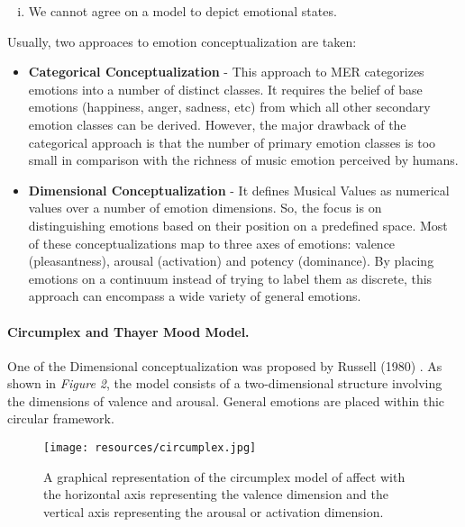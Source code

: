 {\begin{enumerate}[(i)]
        \item We cannot agree on a model to depict emotional states.
        \end{enumerate}

Usually, two approaces to emotion conceptualization are taken: 

\begin{itemize}
    \item \textbf{Categorical Conceptualization} - This approach to MER categorizes emotions into a number of distinct classes. 
        It requires the belief of base emotions (happiness, anger, sadness, etc) from which all other secondary emotion classes can be derived.\cite{Ekman1992}
        However, the major drawback of the categorical approach is that the number of primary emotion classes is too small in comparison with the richness of music emotion perceived by humans.

    \item \textbf{Dimensional Conceptualization} - It defines Musical Values as numerical values over a number of emotion dimensions. 
        So, the focus is on distinguishing emotions based on their position on a predefined space.
        Most of these conceptualizations map to three axes of emotions: valence (pleasantness), arousal (activation) and potency (dominance).
        By placing emotions on a continuum instead of trying to label them as discrete, this approach can encompass a wide variety of general emotions.

\end{itemize}

\paragraph{Circumplex and Thayer Mood Model.}

One of the Dimensional conceptualization was proposed by Russell (1980) \cite{Russell1980}.
As shown in \textit{Figure 2}, the model consists of a two-dimensional structure involving the dimensions of valence and arousal. 
General emotions are placed within thic circular framework.

\begin{figure}[hlvt!]
        \centering
        \texttt{[image: resources/circumplex.jpg]}
        \caption{A graphical representation of the circumplex model of affect with the horizontal axis representing the valence dimension and the vertical axis representing the arousal or activation dimension.}
        \label{fig:figure2}
\end{figure}

}
